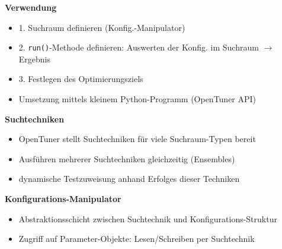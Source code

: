   \begingroup
  \begin{frame}
  \textbf{Verwendung}
  \begin{itemize}
    \item 1. Suchraum definieren (Konfig.-Manipulator)
    \item 2. \texttt{run()}-Methode definieren: Auswerten der Konfig. im Suchraum $\rightarrow$ Ergebnis
    \item 3. Festlegen des Optimierungsziels
    \item Umsetzung mittels kleinem Python-Programm (OpenTuner API)
    
  \end{itemize}
  \textbf{Suchtechniken}
  \begin{itemize}
    \item OpenTuner stellt Suchtechniken für viele Suchraum-Typen bereit
    \item Ausführen mehrerer Suchtechniken gleichzeitig (Ensembles)
    \item dynamische Testzuweisung anhand Erfolges dieser Techniken
  \end{itemize}
  
  \textbf{Konfigurations-Manipulator}
  \begin{itemize}
    \item Abstraktionsschicht zwischen Suchtechnik und Konfigurations-Struktur
    \item Zugriff auf Parameter-Objekte: Lesen/Schreiben per Suchtechnik
    
  \end{itemize}
  \end{frame}
  \endgroup
    
